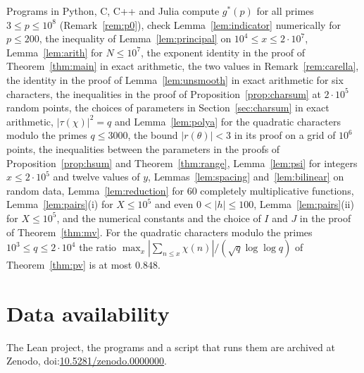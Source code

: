 \documentclass[12pt]{amsart}
\newcommand{\zenodoID}{10.5281/zenodo.0000000}
\theoremstyle{remark}
\begin{document}
Programs in Python, C, C++ and Julia compute $g^*(p)$ for all primes $3\le p\le10^8$
(Remark~\ref{rem:p0}), check Lemma~\ref{lem:indicator} numerically for $p\le200$, the inequality
of Lemma~\ref{lem:principal} on $10^4\le x\le2\cdot10^7$, Lemma~\ref{lem:arith} for
$N\le10^7$, the exponent identity in the proof of Theorem~\ref{thm:main} in exact arithmetic,
the two values in Remark~\ref{rem:carella}, the identity in the proof of
Lemma~\ref{lem:unsmooth} in exact arithmetic for six characters, the inequalities in the proof
of Proposition~\ref{prop:charsum} at $2\cdot10^5$ random points, the choices of parameters
in Section~\ref{sec:charsum} in exact arithmetic, $|\tau(\chi)|^2=q$ and
Lemma~\ref{lem:polya} for the quadratic characters modulo the primes $q\le3000$, the bound
$|r(\theta)|<3$ in its proof on a grid of $10^6$ points, the inequalities between the
parameters in the proofs of Proposition~\ref{prop:hsum} and Theorem~\ref{thm:range},
Lemma~\ref{lem:psi} for integers $x\le2\cdot10^5$ and twelve values of $y$, Lemmas~\ref{lem:spacing} and~\ref{lem:bilinear} on
random data, Lemma~\ref{lem:reduction} for $60$ completely multiplicative functions,
Lemma~\ref{lem:pairs}(i) for $X\le10^5$ and even $0<|h|\le100$, Lemma~\ref{lem:pairs}(ii) for
$X\le10^5$, and the numerical constants and the choice of $I$ and $J$ in the proof of
Theorem~\ref{thm:mv}. For the quadratic characters modulo the
primes $10^3\le q\le2\cdot10^4$ the ratio $\max_x|\sum_{n\le x}\chi(n)|/(\sqrt q\log\log q)$
of Theorem~\ref{thm:pv} is at most $0.848$.

\section*{Data availability}
The Lean project, the programs and a script that runs them are archived at Zenodo,
doi:\href{https://doi.org/\zenodoID}{\zenodoID}.
\end{document}

